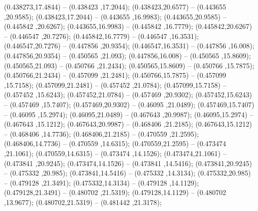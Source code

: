  (0.438273,17.4844) -- (0.438423 ,17.2044);
 (0.438423,20.6577) -- (0.443655 ,20.9585);
 (0.438423,17.2044) -- (0.443655 ,16.9983);
 (0.443655,20.9585) -- (0.445842 ,20.6267);
 (0.443655,16.9983) -- (0.445842 ,16.7779);
 (0.445842,20.6267) -- (0.446547 ,20.7276);
 (0.445842,16.7779) -- (0.446547 ,16.3531);
 (0.446547,20.7276) -- (0.447856 ,20.9354);
 (0.446547,16.3531) -- (0.447856 ,16.008);
 (0.447856,20.9354) -- (0.450565 ,21.093);
 (0.447856,16.008) -- (0.450565 ,15.8609);
 (0.450565,21.093) -- (0.450766 ,21.2434);
 (0.450565,15.8609) -- (0.450766 ,15.7875);
 (0.450766,21.2434) -- (0.457099 ,21.2481);
 (0.450766,15.7875) -- (0.457099 ,15.7158);
 (0.457099,21.2481) -- (0.457452 ,21.0784);
 (0.457099,15.7158) -- (0.457452 ,15.6243);
 (0.457452,21.0784) -- (0.457469 ,20.9302);
 (0.457452,15.6243) -- (0.457469 ,15.7407);
 (0.457469,20.9302) -- (0.46095 ,21.0489);
 (0.457469,15.7407) -- (0.46095 ,15.2974);
 (0.46095,21.0489) -- (0.467643 ,20.9987);
 (0.46095,15.2974) -- (0.467643 ,15.1212);
 (0.467643,20.9987) -- (0.468406 ,21.2185);
 (0.467643,15.1212) -- (0.468406 ,14.7736);
 (0.468406,21.2185) -- (0.470559 ,21.2595);
 (0.468406,14.7736) -- (0.470559 ,14.6315);
 (0.470559,21.2595) -- (0.473474 ,21.1061);
 (0.470559,14.6315) -- (0.473474 ,14.1526);
 (0.473474,21.1061) -- (0.473841 ,20.9245);
 (0.473474,14.1526) -- (0.473841 ,14.5416);
 (0.473841,20.9245) -- (0.475332 ,20.985);
 (0.473841,14.5416) -- (0.475332 ,14.3134);
 (0.475332,20.985) -- (0.479128 ,21.3491);
 (0.475332,14.3134) -- (0.479128 ,14.1129);
 (0.479128,21.3491) -- (0.480702 ,21.5319);
 (0.479128,14.1129) -- (0.480702 ,13.9677);
 (0.480702,21.5319) -- (0.481442 ,21.3178);
